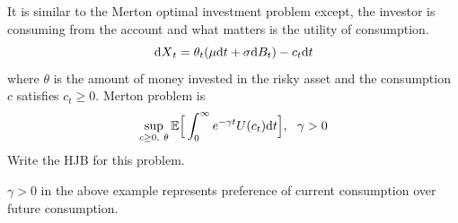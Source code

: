 \documentclass[11pt]{book}
\newcommand{\dd}{\text{\normalfont d}}
\newcommand{\dt}{\text{\normalfont d}t}
\newcommand{\dX}{\text{\normalfont d}X}
\begin{document}
\begin{ex}
    {}
    It is similar to the Merton optimal investment problem except, the investor is consuming from the account and what matters is the utility of consumption.
    \begin{equation}
        {\dX}_t=\theta_t(\mu {{\dt}}+ \sigma {\dd}B_t)-c_t{{\dt}}
    \end{equation}
    where $\theta$ is the amount of money invested in the risky asset and the consumption $c$ satisfies $c_t\ge0$.
    Merton problem is 
    \begin{equation}
        \sup_{c\ge0,~\theta}\mathbb{E}\Big[\int_0^\infty e^{-\gamma t}U(c_t){\dt}\Big], ~~\gamma>0
    \end{equation}
    Write the HJB for this problem.
\end{ex}
\begin{rem}
    $\gamma>0$ in the above example represents preference of current consumption over future consumption.
\end{rem}
\end{document}
